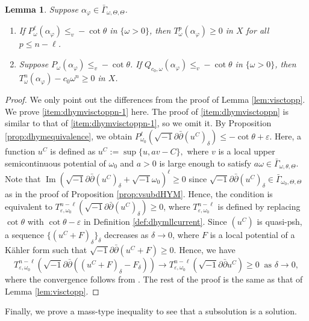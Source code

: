 \documentclass{amsart}
\numberwithin{equation}{section}
\theoremstyle{plain}
\newtheorem{lem}[equation]{Lemma}
\theoremstyle{definition}
\theoremstyle{remark}
\newcommand{\delb}{\sqrt{-1}\partial\bar{\partial}}
\begin{document}
\begin{lem}\label{lem:dhymvisctopp} Suppose $\alpha_\varphi\in\bar{\Gamma}_{\omega,\Theta,\Theta}$.
    \begin{enumerate}[label={\upshape(\roman*)}]
        \item\label{item:dhymvisctoppn-1} 
        If $P^\ell_{\omega}(\alpha_\varphi)\le_v -\cot\theta$ in $\{\omega>0\}$, then $T^p_\omega(\alpha_\varphi)\ge0$ in $X$ for all $p\le n-\ell$.
        \item\label{item:dhymvisctoppn} 
        Suppose $P_{\omega}(\alpha_\varphi)\le_v -\cot\theta$. If $Q_{c_0,\omega}(\alpha_\varphi)\le_v -\cot\theta$ in $\{\omega>0\}$, then $T^n_\omega(\alpha_\varphi)-c_0\omega^n\ge0$ in $X$. 
    \end{enumerate}
\end{lem}

\begin{proof}
    We only point out the differences from the proof of Lemma \ref{lem:visctopp}.
    We prove \ref{item:dhymvisctoppn-1} here. The proof of \ref{item:dhymvisctoppn} is similar to that of \ref{item:dhymvisctoppn-1}, so we omit it. By Proposition \ref{prop:dhymequivalence}, we obtain $P^\ell_{\omega_0}(\delb (u^C)_\delta)\le-\cot\theta+\varepsilon$. Here, a function $u^C$ is defined as $u^C:=\sup \{u,av-C\},$ where $v$ is a local upper semicontinuous potential of $\omega_0$ and $a>0$ is large enough to satisfy $a\omega\in\bar{\Gamma}_{\omega,\theta,\Theta}$.
    Note that $\operatorname{Im}(\delb (u^C)_\delta+\sqrt{-1}\omega_0)^\ell\ge0$ since $\delb (u^C)_\delta\in\bar{\Gamma}_{\omega_0,\Theta,\Theta}$ as in the proof of Proposition \ref{prop:vsubdHYM}. Hence, the condition is equivalent to $T^{n-\ell}_{\varepsilon,\omega_0}(\delb (u^C)_\delta)\ge0$, where $T^{n-\ell}_{\varepsilon,\omega_0}$ is defined by replacing $\cot\theta$ with $\cot\theta-\varepsilon$ in Definition \ref{def:dhymllcurrent}. Since $(u^C)$ is quasi-psh, a sequence $\{(u^C+F)_\delta\}_\delta$ decreases as $\delta\to0$, where $F$ is a local potential of a Kähler form such that $\delb (u^C+F)\ge0$.
    Hence, we have
    $$T^{n-\ell}_{\varepsilon,\omega_0}(\delb ((u^C+F)_\delta-F_\delta))\to T^{n-\ell}_{\varepsilon,\omega_0}(\delb u^C)\ge0 \ \text{ as } \delta\to0,$$
    where the convergence follows from \cite[Theorem 2.1]{BT}. The rest of the proof is the same as that of Lemma \ref{lem:visctopp}. 
\end{proof}

Finally, we prove a mass-type inequality to see that a subsolution is a solution.
\end{document}
